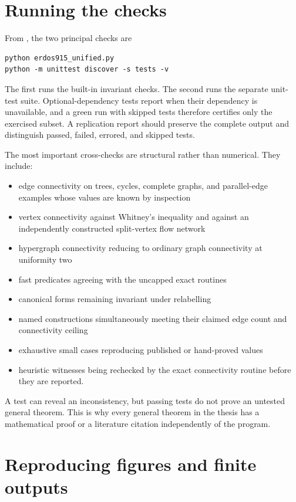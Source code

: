 \section{Running the checks}\label{app:software-tests}

From , the two principal checks are

\begin{verbatim}
python erdos915_unified.py
python -m unittest discover -s tests -v
\end{verbatim}

The first runs the built-in invariant checks. The second runs the separate unit-test suite. Optional-dependency tests report  when their dependency is unavailable, and a green run with skipped tests therefore certifies only the exercised subset. A replication report should preserve the complete output and distinguish passed, failed, errored, and skipped tests.

The most important cross-checks are structural rather than numerical. They include:

\begin{itemize}
  \item edge connectivity on trees, cycles, complete graphs, and parallel-edge examples whose values are known by inspection
  \item vertex connectivity against Whitney's inequality and against an independently constructed split-vertex flow network
  \item hypergraph connectivity reducing to ordinary graph connectivity at uniformity two
  \item fast predicates agreeing with the uncapped exact routines
  \item canonical forms remaining invariant under relabelling
  \item named constructions simultaneously meeting their claimed edge count and connectivity ceiling
  \item exhaustive small cases reproducing published or hand-proved values
  \item heuristic witnesses being rechecked by the exact connectivity routine before they are reported.
\end{itemize}

A test can reveal an inconsistency, but passing tests do not prove an untested general theorem. This is why every general theorem in the thesis has a mathematical proof or a literature citation independently of the program.

\section{Reproducing figures and finite outputs}\label{app:software-reproduction}

